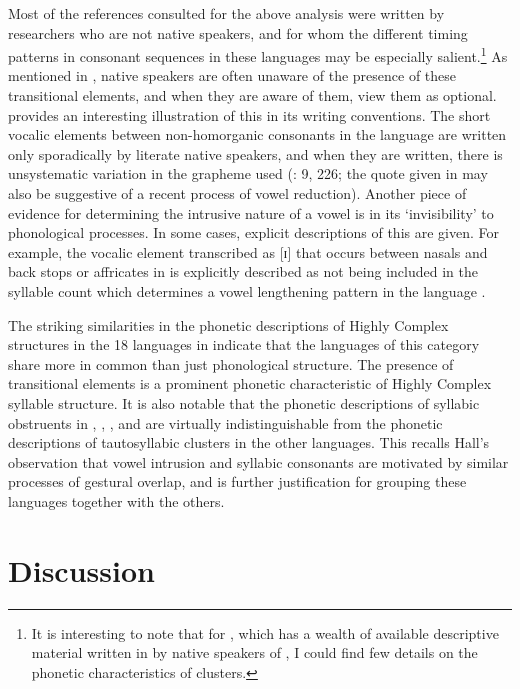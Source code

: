   Most of the references consulted for the above analysis were written by researchers who are not native speakers, and for whom the different timing patterns in consonant sequences in these languages may be especially salient.\footnote{{It is interesting to note that for , which has a wealth of available descriptive material written in  by native speakers of , I could find few details on the phonetic characteristics of clusters.}} As mentioned in , native speakers are often unaware of the presence of these transitional elements, and when they are aware of them, view them as optional.  provides an interesting illustration of this in its writing conventions. The short vocalic elements between non-homorganic consonants in the language are written only sporadically by literate native speakers, and when they are written, there is unsystematic variation in the grapheme used (\citealt{Whitehead2004}: 9, 226; the quote given in  may also be suggestive of a recent process of vowel reduction). Another piece of evidence for determining the intrusive nature of a vowel is in its ‘invisibility’ to phonological processes. In some cases, explicit descriptions of this are given. For example, the vocalic element transcribed as [ɪ] that occurs between nasals and back stops or affricates in  is explicitly described as not being included in the syllable count which determines a vowel lengthening pattern in the language \citep[27]{Rose1981}.

  The striking similarities in the phonetic descriptions of Highly Complex structures in the 18 languages in  indicate that the languages of this category share more in common than just phonological structure. The presence of transitional elements is a prominent phonetic characteristic of Highly Complex syllable structure. It is also notable that the phonetic descriptions of syllabic obstruents in , , , and  are virtually indistinguishable from the phonetic descriptions of tautosyllabic clusters in the other languages. This recalls Hall’s observation that vowel intrusion and syllabic consonants are motivated by similar processes of gestural overlap, and is further justification for grouping these languages together with the others.

\section{Discussion}\label{sec:3.5}

